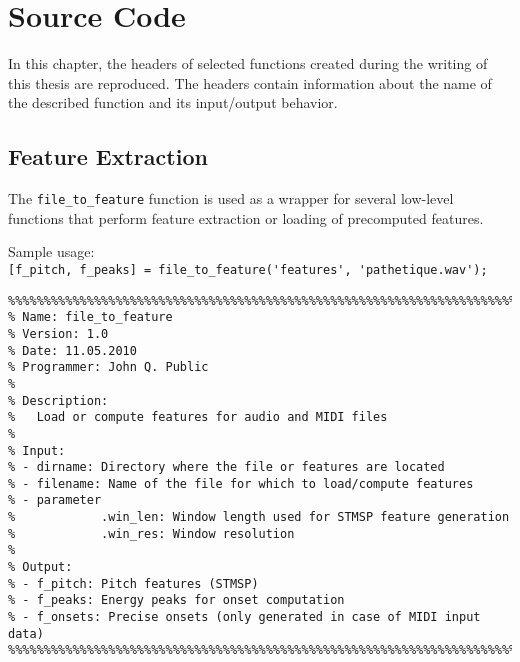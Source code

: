 \chapter{Source Code}
\label{chapter:source_code}

In this chapter, the headers of selected \MATLAB{} functions created during the writing of this thesis are reproduced. The headers contain information about the name of the described function and its input/output behavior.

\section*{Feature Extraction}
The \texttt{file\_to\_feature} function is used as a wrapper for several low-level functions that perform feature extraction or loading of precomputed features.

Sample usage:\\
\scriptsize
\verb|[f_pitch, f_peaks] = file_to_feature('features', 'pathetique.wav');|
\vspace{-0.2cm}
\begin{verbatim}
%%%%%%%%%%%%%%%%%%%%%%%%%%%%%%%%%%%%%%%%%%%%%%%%%%%%%%%%%%%%%%%%%%%%%%%%%%%
% Name: file_to_feature
% Version: 1.0
% Date: 11.05.2010
% Programmer: John Q. Public
%
% Description:
%   Load or compute features for audio and MIDI files
%
% Input:
% - dirname: Directory where the file or features are located
% - filename: Name of the file for which to load/compute features
% - parameter
%            .win_len: Window length used for STMSP feature generation
%            .win_res: Window resolution
%
% Output:
% - f_pitch: Pitch features (STMSP)
% - f_peaks: Energy peaks for onset computation
% - f_onsets: Precise onsets (only generated in case of MIDI input data)
%%%%%%%%%%%%%%%%%%%%%%%%%%%%%%%%%%%%%%%%%%%%%%%%%%%%%%%%%%%%%%%%%%%%%%%%%%%
\end{verbatim}
\normalsize
